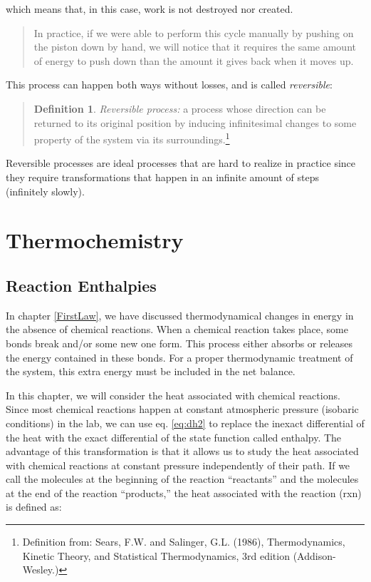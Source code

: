 \documentclass[
  9pt,
]{extbook}
\theoremstyle{definition}
\newtheorem{definition}{Definition}[chapter]
\theoremstyle{definition}
\theoremstyle{definition}
\theoremstyle{remark}
\begin{document}
which means that, in this case, work is not destroyed nor created.

\begin{quote}
In practice, if we were able to perform this cycle manually by pushing on the piston down by hand, we will notice that it requires the same amount of energy to push down than the amount it gives back when it moves up.
\end{quote}

This process can happen both ways without losses, and is called \emph{reversible}:

\begin{quote}
\begin{definition}
\protect\hypertarget{def:reversible}{}{\label{def:reversible} }\emph{Reversible process:} a process whose direction can be returned to its original position by inducing infinitesimal changes to some property of the system via its surroundings.\footnote{Definition from: Sears, F.W. and Salinger, G.L. (1986), Thermodynamics, Kinetic Theory, and Statistical Thermodynamics, 3rd edition (Addison-Wesley.)}
\end{definition}
\end{quote}

Reversible processes are ideal processes that are hard to realize in practice since they require transformations that happen in an infinite amount of steps (infinitely slowly).

\newcommand*{\standardstate}{{-\kern-6pt{\ominus}\kern-6pt-}}

\hypertarget{Thermochemistry}{%
\chapter{Thermochemistry}\label{Thermochemistry}}

\hypertarget{rxnenthalpy}{%
\section{Reaction Enthalpies}\label{rxnenthalpy}}

In chapter \ref{FirstLaw}, we have discussed thermodynamical changes in energy in the absence of chemical reactions. When a chemical reaction takes place, some bonds break and/or some new one form. This process either absorbs or releases the energy contained in these bonds. For a proper thermodynamic treatment of the system, this extra energy must be included in the net balance.

In this chapter, we will consider the heat associated with chemical reactions. Since most chemical reactions happen at constant atmospheric pressure (isobaric conditions) in the lab, we can use eq. \eqref{eq:dh2} to replace the inexact differential of the heat with the exact differential of the state function called enthalpy. The advantage of this transformation is that it allows us to study the heat associated with chemical reactions at constant pressure independently of their path. If we call the molecules at the beginning of the reaction ``reactants'' and the molecules at the end of the reaction ``products,'' the heat associated with the reaction (rxn) is defined as:
\end{document}
